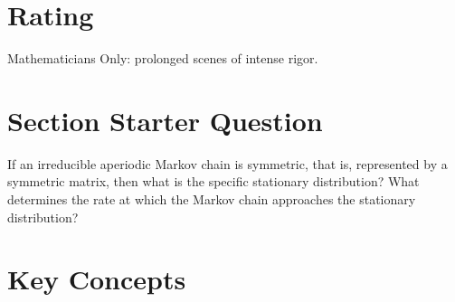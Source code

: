 \documentclass[12pt]{article}
\begin{document}
\myheader \mytitle

\hr


\hr

\usefirefox



\section*{Rating} %
Mathematicians Only:  prolonged scenes of intense rigor.

\hr

\section*{Section Starter Question}

If an irreducible aperiodic Markov chain is symmetric, that is,
represented by a symmetric matrix, then what is the specific stationary
distribution?  What determines the rate at which the Markov chain
approaches the stationary distribution?

\hr

\section*{Key Concepts}
\end{document}
